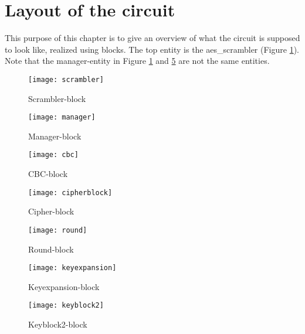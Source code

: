 \chapter*{Layout of the circuit} \label{app:blocks}
This purpose of this chapter is to give an overview of what the circuit is 
supposed to look like, realized using blocks. The top entity is the 
aes\_scrambler (Figure \ref{block:scrambler}). Note that the manager-entity in Figure \ref{block:scrambler} and 
\ref{block:round} are not the same entities.

\begin{figure}
  \texttt{[image: scrambler]}
  \caption{Scrambler-block}
  \label{block:scrambler}
\end{figure}

\begin{figure}
  \texttt{[image: manager]}
  \caption{Manager-block}
  \label{block:manager}
\end{figure}

\begin{figure}
  \texttt{[image: cbc]}
  \caption{CBC-block}
  \label{block:cbc}
\end{figure}

\begin{figure}
  \texttt{[image: cipherblock]}
  \caption{Cipher-block}
  \label{block:cipher}
\end{figure}

\begin{figure}
  \texttt{[image: round]}
  \caption{Round-block}
  \label{block:round}
\end{figure}

\begin{figure}
  \texttt{[image: keyexpansion]}
  \caption{Keyexpansion-block}
  \label{block:keyexpansion}
\end{figure}

\begin{figure}
  \texttt{[image: keyblock2]}
  \caption{Keyblock2-block}
  \label{block:keyblock2}
\end{figure}
